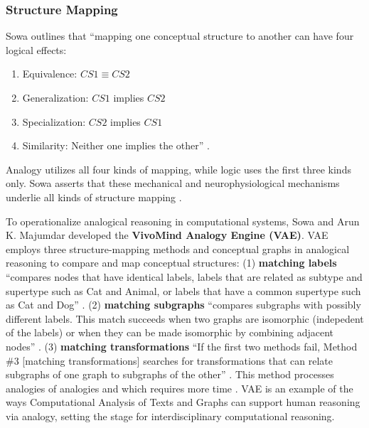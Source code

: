 \subsubsection{Structure Mapping}
Sowa outlines that ``mapping one conceptual structure to another can have four logical effects:
\begin{enumerate}
    \item  Equivalence: $CS1 \equiv CS2$
    \item  Generalization: $CS1$ implies $CS2$
    \item  Specialization: $CS2$ implies $CS1$
    \item  Similarity: Neither one implies the other” \citep[p. 28]{sowa_challenge_2004}. 
\end{enumerate}

Analogy utilizes all four kinds of mapping, while logic uses the first three kinds only. Sowa asserts that these mechanical and neurophysiological mechanisms underlie all kinds of structure mapping \citep[p. 28]{sowa_challenge_2004}.

To operationalize analogical reasoning in computational systems, Sowa and Arun K. Majumdar developed the \textbf{VivoMind Analogy Engine (VAE)}. VAE employs three structure-mapping methods and conceptual graphs in analogical reasoning to compare and map conceptual structures: (1) \textbf{matching labels} ``compares nodes that have identical labels, labels that are related as subtype and supertype such as Cat and Animal, or labels that have a common supertype such as Cat and Dog” \citep[p. 21]{sowa_analogical_2003} . (2) \textbf{matching subgraphs} ``compares subgraphs with possibly different labels. This match succeeds when two graphs are isomorphic (indepedent of the labels) or when they can be made isomorphic by combining adjacent nodes” \citep[p. 21-22]{sowa_analogical_2003}. (3) \textbf{matching transformations} ``If the first two methods fail, Method \#3 [matching transformations] searches for transformations that can relate subgraphs of one graph to subgraphs of the other” \citep[p. 22]{sowa_analogical_2003}. This method processes analogies of analogies and which requires more time \citep[p. 29]{sowa_challenge_2004}. VAE is an example of the ways Computational Analysis of Texts and Graphs can support human reasoning via analogy, setting the stage for interdisciplinary computational reasoning.



